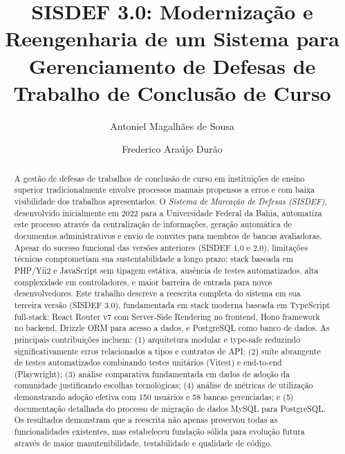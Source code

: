 \documentclass[nonacm, sigconf]{acmart}
\begin{document}
\title{SISDEF 3.0: Modernização e Reengenharia de um Sistema para Gerenciamento de Defesas de Trabalho de Conclusão de Curso}

\author{Antoniel Magalhães de Sousa}

\author{Frederico Araújo Durão}
\renewcommand{\shortauthors}{Antoniel Magalhães de Sousa, Frederico Araújo Durão}

\begin{abstract}
A gestão de defesas de trabalhos de conclusão de curso em instituições de ensino superior tradicionalmente envolve processos manuais propensos a erros e com baixa visibilidade dos trabalhos apresentados. O \textit{Sistema de Marcação de Defesas (SISDEF)}, desenvolvido inicialmente em 2022 para a Universidade Federal da Bahia, automatiza este processo através da centralização de informações, geração automática de documentos administrativos e envio de convites para membros de bancas avaliadoras. Apesar do sucesso funcional das versões anteriores (SISDEF 1.0 e 2.0), limitações técnicas comprometiam sua sustentabilidade a longo prazo: stack baseada em PHP/Yii2 e JavaScript sem tipagem estática, ausência de testes automatizados, alta complexidade em controladores, e maior barreira de entrada para novos desenvolvedores. Este trabalho descreve a reescrita completa do sistema em sua terceira versão (SISDEF 3.0), fundamentada em stack moderna baseada em TypeScript full-stack: React Router v7 com Server-Side Rendering no frontend, Hono framework no backend, Drizzle ORM para acesso a dados, e PostgreSQL como banco de dados. As principais contribuições incluem: (1) arquitetura modular e type-safe reduzindo significativamente erros relacionados a tipos e contratos de API; (2) suíte abrangente de testes automatizados combinando testes unitários (Vitest) e end-to-end (Playwright); (3) análise comparativa fundamentada em dados de adoção da comunidade justificando escolhas tecnológicas; (4) análise de métricas de utilização demonstrando adoção efetiva com 150 usuários e 58 bancas gerenciadas; e (5) documentação detalhada do processo de migração de dados MySQL para PostgreSQL. Os resultados demonstram que a reescrita não apenas preservou todas as funcionalidades existentes, mas estabeleceu fundação sólida para evolução futura através de maior manutenibilidade, testabilidade e qualidade de código.
\end{abstract}
\end{document}
